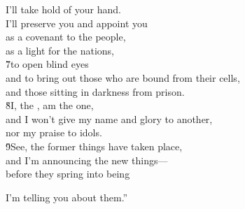 \begin{poetry}
\poemll    I'll take hold of your hand. \\
\poeml I'll preserve you and appoint you \\
\poemll    as a covenant to the people, \\
\poemlll       as a light for the nations, \\
\poeml \v{7}to open blind eyes \\
\poemll    and to bring out those who are bound from their cells, \\
\poemlll       and those sitting in darkness from prison. \\
\poeml \v{8}I, the , am the one, \\
\poemll    and I won't give my name and glory to another, \\
\poemlll       nor my praise to idols. \\
\poeml \v{9}See, the former things have taken place, \\
\poemll    and I'm announcing the new things--- \\
\poeml before they spring into being
\end{poetry}

I'm telling you about them.''

